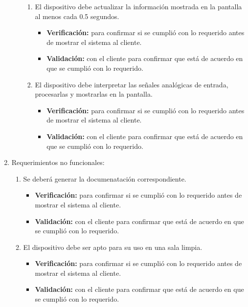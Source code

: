 \documentclass[
11pt, %
codirector, %
]{charter}
\begin{document}
\begin{enumerate}
\begin{enumerate}
\begin{enumerate}[label*=\arabic*.]
\item El dispositivo debe actualizar la información mostrada en la pantalla al menos cada 0.5 segundos.
\begin{itemize}
	\item \textbf{Verificación:} para confirmar si se cumplió con lo requerido antes de mostrar el sistema al cliente.
	\item \textbf{Validación:} con el cliente para confirmar que está de acuerdo en que se cumplió con lo requerido.
\end{itemize}

\item El dispositivo debe interpretar las señales analógicas de entrada, procesarlas y mostrarlas en la pantalla.
\begin{itemize}
	\item \textbf{Verificación:} para confirmar si se cumplió con lo requerido antes de mostrar el sistema al cliente.
	\item \textbf{Validación:} con el cliente para confirmar que está de acuerdo en que se cumplió con lo requerido.
\end{itemize}

\end{enumerate}

\end{enumerate}

\item Requerimientos no funcionales:
\begin{enumerate}
\item Se deberá generar la documenatación correspondiente.
\begin{itemize}
	\item \textbf{Verificación:} para confirmar si se cumplió con lo requerido antes de mostrar el sistema al cliente.
	\item \textbf{Validación:} con el cliente para confirmar que está de acuerdo en que se cumplió con lo requerido.
\end{itemize}

\item El dispositivo debe ser apto para su uso en una sala limpia.
\begin{itemize}
	\item \textbf{Verificación:} para confirmar si se cumplió con lo requerido antes de mostrar el sistema al cliente.
	\item \textbf{Validación:} con el cliente para confirmar que está de acuerdo en que se cumplió con lo requerido.
\end{itemize}


\end{enumerate}
\end{enumerate}
\end{document}
